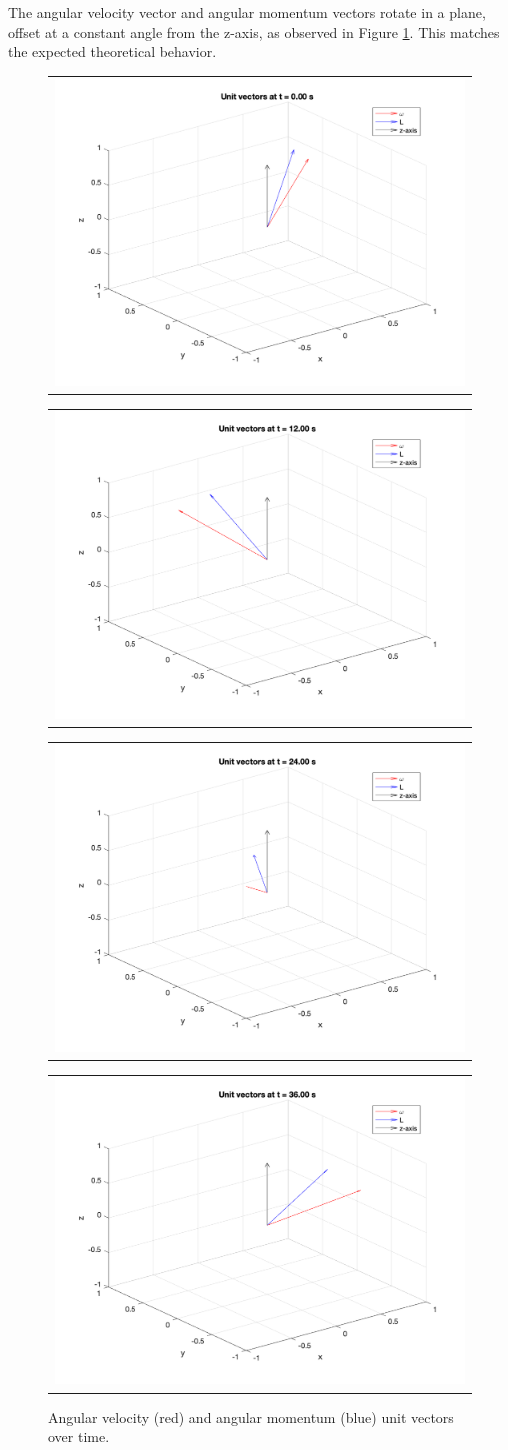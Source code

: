 The angular velocity vector and angular momentum vectors rotate in a plane, offset at a constant angle from the z-axis, as observed in Figure \ref{fig:Body Axis Momentum Snapshots}. This matches the expected theoretical behavior.

\begin{figure}[H]
  \centering
  \begin{tabular}{@{}c@{}}
  \includegraphics[width=.49\linewidth]{Images/ps3_problem3_vectors_1.png}
  \end{tabular}
  \begin{tabular}{@{}c@{}}
  \includegraphics[width=.49\linewidth]{Images/ps3_problem3_vectors_121.png}
  \end{tabular}
  \begin{tabular}{@{}c@{}}
  \includegraphics[width=.49\linewidth]{Images/ps3_problem3_vectors_241.png}
  \end{tabular}
  \begin{tabular}{@{}c@{}}
  \includegraphics[width=.49\linewidth]{Images/ps3_problem3_vectors_361.png}
  \end{tabular}
  \caption{Angular velocity (red) and angular momentum (blue) unit vectors over time.}
  \label{fig:Body Axis Momentum Snapshots}
\end{figure}